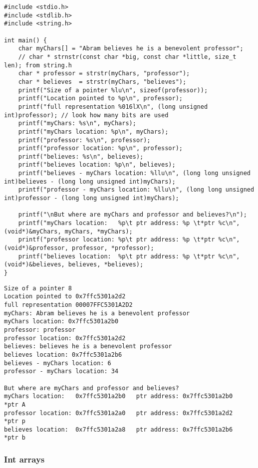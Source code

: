 \documentclass[11pt]{article}
\begin{document}
\begin{verbatim}
#include <stdio.h>
#include <stdlib.h>
#include <string.h>

int main() {
    char myChars[] = "Abram believes he is a benevolent professor";
    // char * strnstr(const char *big, const char *little, size_t len); from string.h
    char * professor = strstr(myChars, "professor");
    char * believes  = strstr(myChars, "believes");
    printf("Size of a pointer %lu\n", sizeof(professor));
    printf("Location pointed to %p\n", professor);
    printf("full representation %016lX\n", (long unsigned int)professor); // look how many bits are used
    printf("myChars: %s\n", myChars);
    printf("myChars location: %p\n", myChars);
    printf("professor: %s\n", professor);
    printf("professor location: %p\n", professor);
    printf("believes: %s\n", believes);
    printf("believes location: %p\n", believes);
    printf("believes - myChars location: %llu\n", (long long unsigned int)believes - (long long unsigned int)myChars);
    printf("professor - myChars location: %llu\n", (long long unsigned int)professor - (long long unsigned int)myChars);

    printf("\nBut where are myChars and professor and believes?\n");
    printf("myChars location:   %p\t ptr address: %p \t*ptr %c\n", (void*)&myChars, myChars, *myChars);
    printf("professor location: %p\t ptr address: %p \t*ptr %c\n", (void*)&professor, professor, *professor);
    printf("believes location:  %p\t ptr address: %p \t*ptr %c\n", (void*)&believes, believes, *believes);
}
\end{verbatim}

\begin{verbatim}
Size of a pointer 8
Location pointed to 0x7ffc5301a2d2
full representation 00007FFC5301A2D2
myChars: Abram believes he is a benevolent professor
myChars location: 0x7ffc5301a2b0
professor: professor
professor location: 0x7ffc5301a2d2
believes: believes he is a benevolent professor
believes location: 0x7ffc5301a2b6
believes - myChars location: 6
professor - myChars location: 34

But where are myChars and professor and believes?
myChars location:   0x7ffc5301a2b0	 ptr address: 0x7ffc5301a2b0 	*ptr A
professor location: 0x7ffc5301a2a0	 ptr address: 0x7ffc5301a2d2 	*ptr p
believes location:  0x7ffc5301a2a8	 ptr address: 0x7ffc5301a2b6 	*ptr b
\end{verbatim}

\subsubsection{Int arrays}
\label{sec:org5435415}
\end{document}
